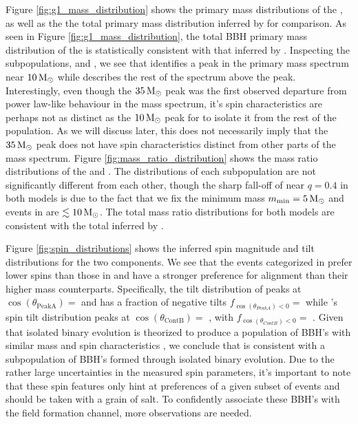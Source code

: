 Figure \ref{fig:g1_mass_distribution} shows the primary mass distributions of the \base{}, as well as the the total primary mass distribution inferred by \brucepaper{} for comparison. As seen in Figure \ref{fig:g1_mass_distribution}, the total BBH primary mass distribution of the \base{} is statistically consistent with that inferred by \brucepaper{}. Inspecting the subpopulations, \first{} and \contB{}, we see that \first{} identifies a peak in the primary mass spectrum near $10{\,\rm M}_\odot$ while \contB{} describes the rest of the spectrum above the peak. Interestingly, even though the $35{\,\rm M}_\odot$ peak was the first observed departure from power law-like behaviour in the mass spectrum, it's spin characteristics are perhaps not as distinct as the $10{\,\rm M}_\odot$ peak for \first{} to isolate it from the rest of the population. As we will discuss later, this does not necessarily imply that the $35{\,\rm M}_\odot$ peak does not have spin characteristics distinct from other parts of the mass spectrum. Figure \ref{fig:mass_ratio_distribution} shows the mass ratio distributions of the \base{} and \comp{}. The distributions of each subpopulation are not significantly different from each other, though the sharp fall-off of \first{} near $q=0.4$ in both models is due to the fact that we fix the minimum mass $m_\text{min}=5{\,\rm M}_\odot$ and events in \first{} are $\lesssim10{\,\rm M}_\odot$. The total mass ratio distributions for both models are consistent with the total inferred by \brucepaper.  

Figure \ref{fig:spin_distributions} shows the inferred spin magnitude and tilt distributions for the two components. We see that the events categorized in \first{} prefer lower spins than those in \contB{} and have a stronger preference for alignment than their higher mass counterparts. Specifically, the tilt distribution of \first{} peaks at $\cos(\theta_\text{PeakA})=$ \result{$\CIPlusMinus{\macros[CosTilt][Base][PeakA][max]}$} and has a fraction of negative tilts $f_{\cos(\theta_{PeakA}) < 0}=$\result{$\CIPlusMinus{\macros[CosTilt][Base][PeakA][negfrac]}$} while \contB{}'s spin tilt distribution peaks at $\cos(\theta_\text{ContB})=$ \result{$\CIPlusMinus{\macros[CosTilt][Base][ContinuumB][max]}$}, with $f_{\cos(\theta_{ContB}) < 0} = $ \result{$\CIPlusMinus{\macros[CosTilt][Base][ContinuumB][negfrac]}$}. Given that isolated binary evolution is theorized to produce a population of BBH's with similar mass and spin characteristics , we conclude that \first{} is consistent with a subpopulation of BBH's formed through isolated binary evolution. Due to the rather large uncertainties in the measured spin parameters, it's important to note that these spin features only hint at preferences of a given subset of events and should be taken with a grain of salt. To confidently associate these BBH's with the field formation channel, more observations are needed. 

